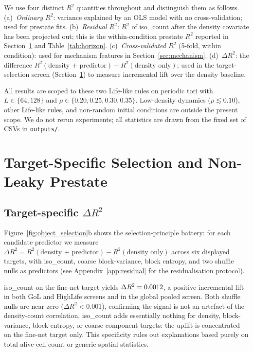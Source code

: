\documentclass[aip,cha,preprint,nofootinbib]{revtex4-2}
\begin{document}
We use four distinct $R^2$ quantities throughout and distinguish them as
follows.
(a)~\emph{Ordinary $R^2$}: variance explained by an OLS model with no
cross-validation; used for prestate fits.
(b)~\emph{Residual $R^2$}: $R^2$ of iso\_count after the density
covariate has been projected out; this is the within-condition prestate
$R^2$ reported in Section~\ref{sec:selection} and Table~\ref{tab:horizon}.
(c)~\emph{Cross-validated $R^2$} (5-fold, within condition): used for
mechanism features in Section~\ref{sec:mechanism}.
(d)~\emph{$\Delta R^2$}: the difference $R^2(\text{density + predictor})
- R^2(\text{density only})$; used in the target-selection screen
(Section~\ref{sec:selection}) to measure incremental lift over the
density baseline.

All results are scoped to these two Life-like rules on periodic tori
with $L\in\{64,128\}$ and $\rho\in\{0.20,0.25,0.30,0.35\}$.
Low-density dynamics ($\rho\lesssim 0.10$), other Life-like rules, and
non-random initial conditions are outside the present scope.
We do not rerun experiments; all statistics are drawn from the fixed set
of CSVs in \texttt{outputs/}.

\section{Target-Specific Selection and Non-Leaky Prestate}
\label{sec:selection}

\subsection{Target-specific \texorpdfstring{$\Delta R^2$}{Delta R squared}}

Figure~\ref{fig:object_selection}b shows the selection-principle battery:
for each candidate predictor we measure $\Delta R^2 =
R^2(\text{density + predictor}) - R^2(\text{density only})$ across six
displayed targets, with iso\_count, coarse block-variance, block entropy,
and two shuffle nulls as predictors (see Appendix~\ref{app:residual}
for the residualisation protocol).

iso\_count on the fine-net target yields $\Delta R^2 = 0.0012$,
a positive incremental lift in both GoL and HighLife screens and in the
global pooled screen.
Both shuffle nulls are near zero ($\Delta R^2 < 0.001$), confirming the
signal is not an artefact of the density-count correlation.
iso\_count adds essentially nothing for density, block-variance,
block-entropy, or coarse-component targets: the uplift is concentrated
on the fine-net target only.
This specificity rules out explanations based purely on total alive-cell
count or generic spatial statistics.
\end{document}
